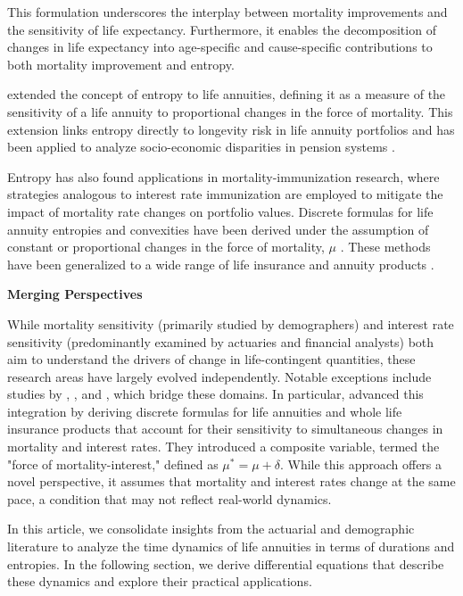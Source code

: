 \documentclass[12pt]{article}
\begin{document}
This formulation underscores the interplay between mortality improvements and the sensitivity of life expectancy. Furthermore, it enables the decomposition of changes in life expectancy into age-specific and cause-specific contributions to both mortality improvement and entropy.

\citet{Haberman2011} extended the concept of entropy to life annuities, defining it as a measure of the sensitivity of a life annuity to proportional changes in the force of mortality. This extension links entropy directly to longevity risk in life annuity portfolios \citep{rabitti2020mortality} and has been applied to analyze socio-economic disparities in pension systems \citep{alvarez2021linking}.

Entropy has also found applications in mortality-immunization research, where strategies analogous to interest rate immunization are employed to mitigate the impact of mortality rate changes on portfolio values. Discrete formulas for life annuity entropies and convexities have been derived under the assumption of constant or proportional changes in the force of mortality, $\mu$ \citep{wang2010optimal,tsai2011actuarial,Tsai2013a,Li2011}. These methods have been generalized to a wide range of life insurance and annuity products \citep{li2012key,Li2012,Wong2015,Luciano2015,levantesi2018natural}.

\textbf{Merging Perspectives}

While mortality sensitivity (primarily studied by demographers) and interest rate sensitivity (predominantly examined by actuaries and financial analysts) both aim to understand the drivers of change in life-contingent quantities, these research areas have largely evolved independently. Notable exceptions include studies by \citet{Haberman2011}, \citet{rabitti2020mortality}, and \citet{alvarez2021linking}, which bridge these domains. In particular, \citet{Lin2020} advanced this integration by deriving discrete formulas for life annuities and whole life insurance products that account for their sensitivity to simultaneous changes in mortality and interest rates. They introduced a composite variable, termed the "force of mortality-interest," defined as $\mu^* = \mu + \delta$. While this approach offers a novel perspective, it assumes that mortality and interest rates change at the same pace, a condition that may not reflect real-world dynamics.

In this article, we consolidate insights from the actuarial and demographic literature to analyze the time dynamics of life annuities in terms of durations and entropies. In the following section, we derive differential equations that describe these dynamics and explore their practical applications.
\end{document}
